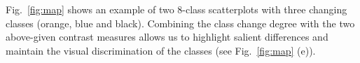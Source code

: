 Fig.~\ref{fig:map} shows an example of two 8-class scatterplots with three  changing classes (orange, blue and black). Combining the class change degree with the two above-given contrast measures allows us to highlight salient differences and maintain the visual discrimination of the classes (see Fig.~\ref{fig:map} (e)).
